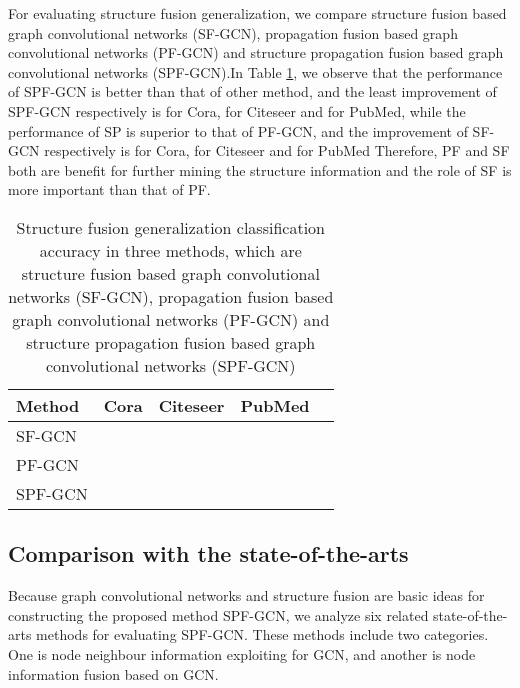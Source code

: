 \documentclass[review]{elsarticle}
\begin{document}
For evaluating structure fusion generalization, we compare structure fusion based graph convolutional networks (SF-GCN), propagation fusion based graph convolutional networks (PF-GCN) and structure propagation fusion based graph convolutional networks (SPF-GCN).In Table \ref{table3}, we observe that the performance of SPF-GCN is better than that of other method, and the least improvement of SPF-GCN respectively is   for Cora,  for Citeseer and  for PubMed, while the performance of SP is superior to that of PF-GCN, and the improvement of SF-GCN respectively is   for Cora,  for Citeseer and  for PubMed Therefore, PF and SF both are benefit for further mining the structure information and the role of SF is more important than that of PF.

\begin{table}[!ht]
\small
\renewcommand{\arraystretch}{1.0}
\caption{Structure fusion generalization classification accuracy in three methods, which are structure fusion based graph convolutional networks (SF-GCN), propagation fusion based graph convolutional networks (PF-GCN) and structure propagation fusion based graph convolutional networks (SPF-GCN)}
\label{table3}
\begin{center}
\newcommand{\tabincell}[2]{\begin{tabular}{@{}#1@{}}#2\end{tabular}}
\begin{tabular}{lp{1cm}p{1cm}p{1cm}p{1cm}}
\hline
\bfseries Method &\bfseries Cora &\bfseries Citeseer &\bfseries PubMed  \\
\hline \hline
SF-GCN &    & &     \\
\hline
PF-GCN  &    & &    \\
\hline\hline
SPF-GCN  &    &  &   \\
\hline
\end{tabular}
\end{center}
\end{table}

\subsection{Comparison with the state-of-the-arts}
\label{State-of-the-arts}
Because graph convolutional networks and structure fusion are basic ideas for constructing the proposed method SPF-GCN, we analyze six related state-of-the-arts methods for evaluating SPF-GCN. These methods include two categories. One is node neighbour information exploiting for GCN, and another is node information fusion based on GCN.
\end{document}
